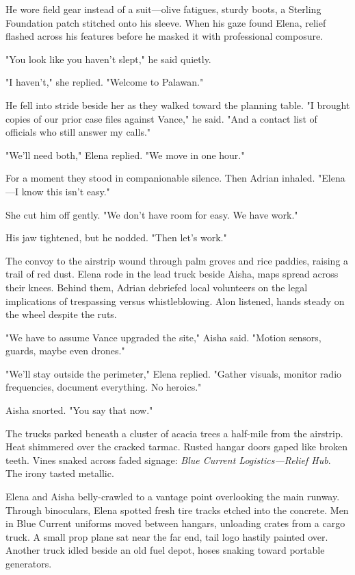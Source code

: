 He wore field gear instead of a suit—olive fatigues, sturdy boots, a Sterling Foundation patch stitched onto his sleeve. When his gaze found Elena, relief flashed across his features before he masked it with professional composure.

"You look like you haven't slept," he said quietly.

"I haven't," she replied. "Welcome to Palawan."

He fell into stride beside her as they walked toward the planning table. "I brought copies of our prior case files against Vance," he said. "And a contact list of officials who still answer my calls."

"We'll need both," Elena replied. "We move in one hour."

For a moment they stood in companionable silence. Then Adrian inhaled. "Elena—I know this isn't easy."

She cut him off gently. "We don't have room for easy. We have work."

His jaw tightened, but he nodded. "Then let's work."

\bigskip

The convoy to the airstrip wound through palm groves and rice paddies, raising a trail of red dust. Elena rode in the lead truck beside Aisha, maps spread across their knees. Behind them, Adrian debriefed local volunteers on the legal implications of trespassing versus whistleblowing. Alon listened, hands steady on the wheel despite the ruts.

"We have to assume Vance upgraded the site," Aisha said. "Motion sensors, guards, maybe even drones."

"We'll stay outside the perimeter," Elena replied. "Gather visuals, monitor radio frequencies, document everything. No heroics."

Aisha snorted. "You say that now."

The trucks parked beneath a cluster of acacia trees a half-mile from the airstrip. Heat shimmered over the cracked tarmac. Rusted hangar doors gaped like broken teeth. Vines snaked across faded signage: \textit{Blue Current Logistics—Relief Hub}. The irony tasted metallic.

Elena and Aisha belly-crawled to a vantage point overlooking the main runway. Through binoculars, Elena spotted fresh tire tracks etched into the concrete. Men in Blue Current uniforms moved between hangars, unloading crates from a cargo truck. A small prop plane sat near the far end, tail logo hastily painted over. Another truck idled beside an old fuel depot, hoses snaking toward portable generators.

